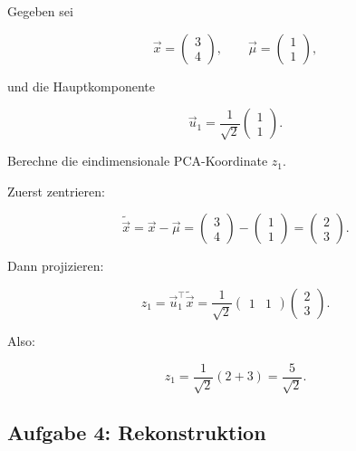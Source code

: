 Gegeben sei

\[
    \vec{x}
    =
    \begin{pmatrix}
        3 \\
        4
    \end{pmatrix},
    \qquad
    \vec{\mu}
    =
    \begin{pmatrix}
        1 \\
        1
    \end{pmatrix},
\]

und die Hauptkomponente

\[
    \vec{u}_1
    =
    \frac{1}{\sqrt{2}}
    \begin{pmatrix}
        1 \\
        1
    \end{pmatrix}.
\]

Berechne die eindimensionale PCA-Koordinate \(z_1\).

\begin{examplebox}
Zuerst zentrieren:

\[
    \tilde{\vec{x}}
    =
    \vec{x}-\vec{\mu}
    =
    \begin{pmatrix}
        3 \\
        4
    \end{pmatrix}
    -
    \begin{pmatrix}
        1 \\
        1
    \end{pmatrix}
    =
    \begin{pmatrix}
        2 \\
        3
    \end{pmatrix}.
\]

Dann projizieren:

\[
    z_1
    =
    \vec{u}_1^{\top}\tilde{\vec{x}}
    =
    \frac{1}{\sqrt{2}}
    \begin{pmatrix}
        1 & 1
    \end{pmatrix}
    \begin{pmatrix}
        2 \\
        3
    \end{pmatrix}.
\]

Also:

\[
    z_1
    =
    \frac{1}{\sqrt{2}}
    (2+3)
    =
    \frac{5}{\sqrt{2}}.
\]
\end{examplebox}

\subsection{Aufgabe 4: Rekonstruktion}

